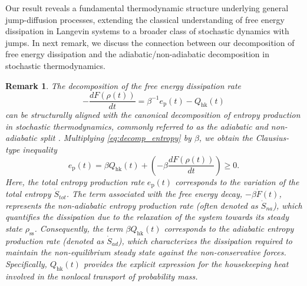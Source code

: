 \documentclass[10pt]{article}
\newtheorem{remark}{Remark}[section]
\theoremstyle{definition}
\numberwithin{equation}{section}
\begin{document}
Our result reveals a fundamental thermodynamic structure underlying general jump-diffusion processes, 
extending the classical understanding of free energy dissipation in Langevin systems to a broader class of stochastic dynamics with jumps. 
In next remark, we discuss the connection between our decomposition of free energy dissipation and the adiabatic/non-adiabatic decomposition in stochastic thermodynamics.

\begin{remark}
The decomposition of the free energy dissipation rate
\begin{equation}\label{eq:decomp_entropy}
  -\frac{dF(\rho(t))}{dt} = \beta^{-1} e_\mathrm{p}(t) - Q_\mathrm{hk}(t)
\end{equation}
can be structurally aligned with the canonical decomposition of entropy production in stochastic thermodynamics, commonly referred to as the adiabatic and non-adiabatic split \cite{esposito2010,EV10,VE10}.
Multiplying \eqref{eq:decomp_entropy} by $\beta$, we obtain the Clausius-type inequality
\begin{equation}
    e_\mathrm{p}(t) = \beta Q_\mathrm{hk}(t) + \left( -\beta \frac{dF(\rho(t))}{dt} \right) \geq 0.
\end{equation}
Here, the total entropy production rate $e_\mathrm{p}(t)$ corresponds to the variation of the total entropy $\dot{S}_{tot}$. The term associated with the free energy decay, $-\beta \dot{F}(t)$, represents the \emph{non-adiabatic entropy production rate} (often denoted as $\dot{S}_{na}$), which quantifies the dissipation due to the relaxation of the system towards its steady state $\rho_\mathrm{ss}$.
Consequently, the term $\beta Q_\mathrm{hk}(t)$ corresponds to the \emph{adiabatic entropy production rate} (denoted as $\dot{S}_{ad}$), which characterizes the dissipation required to maintain the non-equilibrium steady state against the non-conservative forces.
Specifically, $Q_\mathrm{hk}(t)$ provides the explicit expression for the housekeeping heat involved in the nonlocal transport of probability mass.
\end{remark}



\end{document}
